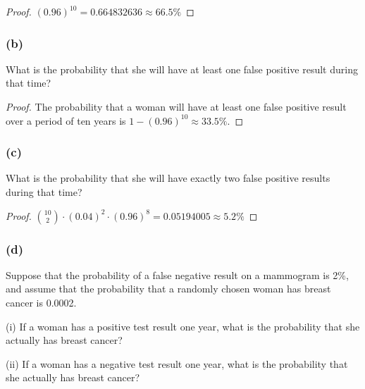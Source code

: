 \documentclass[14pt]{extarticle}
\begin{document}
\begin{proof}
     \((0.96)^{10} = 0.664832636 \approx 66.5\%\)
\end{proof}

\subsubsection{(b)}
What is the probability that she will have at least one false positive result during that time?

\begin{proof}
     The probability that a woman will have at least one false positive result over a period of ten years is
     \(1 - (0.96)^{10} \approx 33.5\%\).
\end{proof}

\subsubsection{(c)}
What is the probability that she will have exactly two false positive results during that time?

\begin{proof}
     \(\binom{10}{2} \cdot (0.04)^{2} \cdot (0.96)^{8} = 0.05194005 \approx 5.2\%\)
\end{proof}

\subsubsection{(d)}
Suppose that the probability of a false negative result on a mammogram is 2\%, and assume that the probability that a
randomly chosen woman has breast cancer is 0.0002.

(i) If a woman has a positive test result one year, what is the probability that she actually has breast cancer?

(ii) If a woman has a negative test result one year, what is the probability that she actually has breast cancer?
\end{document}
